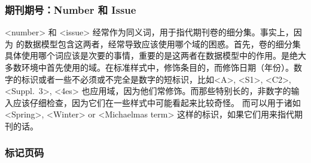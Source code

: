 \subsubsection{期刊期号：Number 和 Issue}
\label{bib:use:issnum}


 <number> 和 <issue> 经常作为同义词，用于指代期刊卷的细分集。事实上，因为 \biblatex 的数据模型包含这两者，经常导致应该使用哪个域的困惑。首先，卷的细分集具体使用哪个词应该是次要的事情，重要的是这两者在数据模型中的作用。是绝大多数环境中首先使用的域。在标准样式中，修饰条目的，而修饰日期（年份）。数字的标识或者一些不必须或不完全是数字的短标识，比如<A>, <S1>, <C2>, <Suppl.\ 3>, <4es> 也应用域，因为他们常修饰。而那些特别长的，非数字的输入应该仔细检查，因为它们在一些样式中可能看起来比较奇怪。
 而可以用于诸如<Spring>, <Winter> or <Michaelmas term> 这样的标识，如果它们用来指代期刊的话。


\subsubsection{标记页码}
\label{bib:use:pag}

